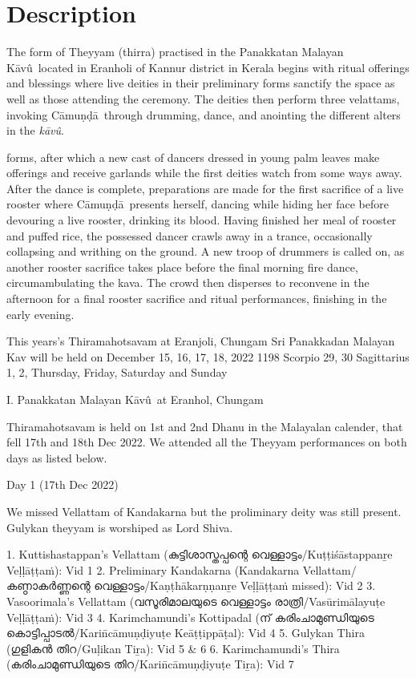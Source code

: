 \documentclass[a4paper, 11pt]{article} %
\newcommand{\camunda}[0]{C\={a}mu\d{n}\d{d}\={a}}
\newcommand{\kavu}[0]{\textit{k\={a}v\^{u}}}
\newcommand{\Kavu}[0]{K\={a}v\^{u}}
\begin{document}
\section{Description}%
  \label{sec:Description}
  
The form of Theyyam (thirra) practised in the Panakkatan Malayan \Kavu\ located in Eranholi of Kannur district in Kerala begins with ritual offerings and blessings where live deities in their preliminary forms sanctify the space as well as those attending the ceremony.
The deities then perform three velattams, invoking \camunda\ through drumming, dance, and anointing the different alters in the \kavu.

forms, after which a new cast of dancers dressed in young palm leaves make offerings and receive garlands while the first deities watch from some ways away.
After the dance is complete, preparations are made for the first sacrifice of a live rooster where \camunda\ presents herself, dancing while hiding her face before devouring a live rooster, drinking its blood.
Having finished her meal of rooster and puffed rice, the possessed dancer crawls away in a trance, occasionally collapsing and writhing on the ground. 
A new troop of drummers is called on, as another rooster sacrifice takes place before the final morning fire dance, circumambulating the kava.
The crowd then disperses to reconvene in the afternoon for a final rooster sacrifice and ritual performances, finishing in the early evening.

This years's Thiramahotsavam at Eranjoli, Chungam Sri Panakkadan Malayan Kav will be held on December 15, 16, 17, 18, 2022 1198 Scorpio 29, 30 Sagittarius 1, 2, Thursday, Friday, Saturday and Sunday

I. Panakkatan Malayan \Kavu\ at Eranhol, Chungam

Thiramahotsavam is held on 1st and 2nd Dhanu in the Malayalan calender, that fell 17th and 18th Dec 2022. We attended all the Theyyam performances on both days as listed below.

Day 1 (17th Dec 2022)

We missed Vellattam of Kandakarna but the proliminary deity was still present. Gulykan theyyam is worshiped as Lord Shiva.

1. Kuttishastappan's Vellattam (കുട്ടിശാസ്തപ്പന്റെ വെള്ളാട്ടം/Kuṭṭiśāstappanṟe Veḷḷāṭṭaṁ): Vid 1
2. Preliminary Kandakarna (Kandakarna Vellattam/കണ്ഠാകർണ്ണന്റെ വെള്ളാട്ടം/Kaṇṭhākarṇṇanṟe Veḷḷāṭṭaṁ missed): Vid 2
3. Vasoorimala's Vellattam (വസൂരിമാലയുടെ വെള്ളാട്ടം രാത്രി/Vasūrimālayuṭe Veḷḷāṭṭaṁ): Vid 3
4. Karimchamundi's Kottipadal (ന് കരിംചാമുണ്ഡിയുടെ കൊട്ടിപ്പാടൽ/Karin̄cāmuṇḍiyuṭe Keāṭṭippāṭal): Vid 4
5. Gulykan Thira (ഗുളികൻ തിറ/Guḷikan Tiṟa): Vid 5 & 6
6. Karimchamundi's Thira (കരിംചാമുണ്ഡിയുടെ തിറ/Karin̄cāmuṇḍiyuṭe Tiṟa): Vid 7
\end{document}
